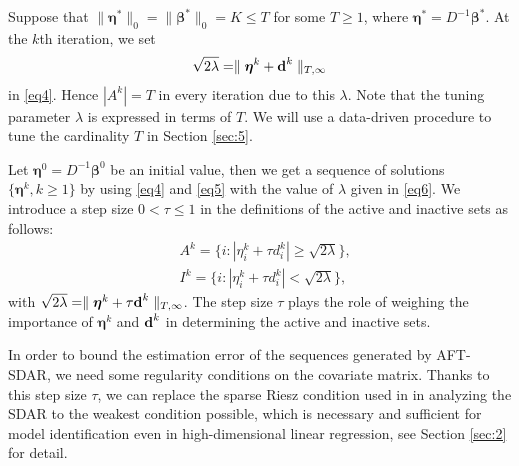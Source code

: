 \documentclass[12pt]{article}
\newcommand{\bd}{\mbox{\bf d}}
\newcommand{\bbeta}{\boldsymbol{\beta}}
\newcommand{\boldeta}{\boldsymbol{\eta}}
\begin{document}
Suppose that $\|\boldeta^*\|_{0}=\|\bbeta^*\|_{0}=K\leq T$ for some $T \ge 1$,
where $\boldeta^*=D^{-1}\bbeta^*$.
At the $k$th iteration, we set
\begin{align}\label{eq6}
\sqrt{2\lambda}=\parallel\boldeta^k+ \bd^k\parallel_{T,\infty}
\end{align}
 in \eqref{eq4}. Hence $|A^k|=T$ in every iteration due to this $\lambda$. Note that the tuning parameter $\lambda$ is expressed in terms of $T$. We will use a data-driven procedure to tune the cardinality $T$ in Section \ref{sec:5}.

Let $\boldeta^0=D^{-1}\bbeta^0$ be an initial value, then we get a sequence of solutions $\{\boldeta^k,k\geq1\}$ by using \eqref{eq4}
 and \eqref{eq5} with the value of $\lambda$ given in \eqref{eq6}.
We introduce a step size $0 < \tau \le 1$
 in the definitions of the active and inactive sets as follows:
 \begin{equation}
 \label{eq4b}
\begin{split}
&A^k=\{i:|\eta^k_{i}+ \tau d^k_{i}|\geq\sqrt{2\lambda}\},\\
&I^k=\{i:|\eta^k_{i}+ \tau d^k_{i}|<\sqrt{2\lambda}\},
\end{split}
\end{equation}
with $\sqrt{2\lambda}=\parallel\boldeta^k+ \tau \bd^k\parallel_{T,\infty}$.
The step size $\tau$ plays the role of weighing the importance of  $\boldeta^k$ and $\bd^k$ in determining the active and inactive sets.

{In order to bound the estimation error of the sequences generated by AFT-SDAR, we need some regularity conditions on the covariate matrix. %
 Thanks to
 this step size $\tau$, we can replace the sparse Riesz condition  used in %
\cite{huang2018constructive}
 in analyzing the SDAR   to the weakest condition possible, which  is necessary and  sufficient for model identification even in high-dimensional linear regression, see Section \ref{sec:2}  for detail.
}
\end{document}
